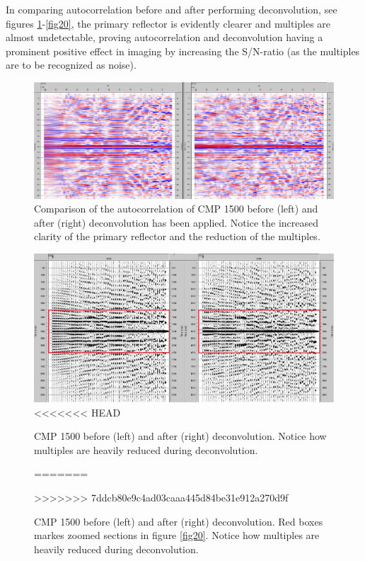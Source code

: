 \documentclass[10pt,a4paper]{article}
\begin{document}
\noindent In comparing autocorrelation before and after performing deconvolution, see figures \ref{fig18}-\ref{fig20}, the primary reflector is evidently clearer and multiples are almost undetectable, proving autocorrelation and deconvolution having a prominent positive effect in imaging by increasing the S/N-ratio (as the multiples are to be recognized as noise).

\begin{figure}[H]
\includegraphics[width=\textwidth]{fig18.jpg}
\caption{Comparison of the autocorrelation of CMP 1500 before (left) and after (right) deconvolution has been applied. Notice the increased clarity of the primary reflector and the reduction of the multiples.}
\label{fig18}
\end{figure}

\begin{figure}[H]
\includegraphics[width=\textwidth]{fig19.jpg}
<<<<<<< HEAD
\caption{CMP 1500 before (left) and after (right) deconvolution. Notice how multiples are heavily reduced during deconvolution.}
=======
\caption{CMP 1500 before (left) and after (right) deconvolution. Red boxes markes zoomed sections in figure \ref{fig20}. Notice how multiples are heavily reduced during deconvolution.}
>>>>>>> 7ddcb80e9c4ad03caaa445d84be31e912a270d9f
\label{fig19}
\end{figure}
\end{document}

